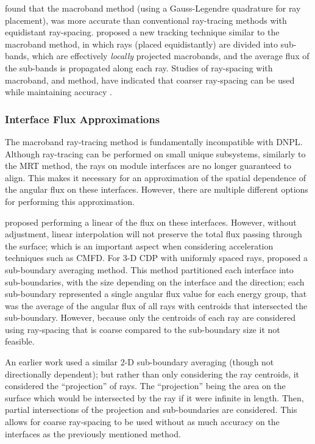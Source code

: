 {{{      \citet{Yamamoto2005} found that the macroband method (using a Gauss-Legendre quadrature for ray placement), was more accurate than conventional ray-tracing methods with equidistant ray-spacing.
      \citet{Fevotte2007} proposed a new tracking technique similar to the macroband method, in which rays (placed equidistantly) are divided into sub-bands, which are effectively \emph{locally} projected macrobands, and the average flux of the sub-bands is propagated along each ray.
      Studies of ray-spacing with macroband, and  method, have indicated that coarser ray-spacing can be used while maintaining accuracy \cite{Yamamoto2005,Fevotte2007,Yamamoto2008}.

      \subsubsection{Interface Flux Approximations}{\label{sssec:RT:Interface Flux Approximations}
        The macroband ray-tracing method is fundamentally incompatible with \acf{DNPL}.
        Although ray-tracing can be performed on small unique subsystems, similarly to the \ac{MRT} method, the rays on module interfaces are no longer guaranteed to align.
        This makes it necessary for an approximation of the spatial dependence of the angular flux on these interfaces.
        However, there are multiple different options for performing this approximation.

        \citet{Yamamoto2005} proposed performing a linear of the flux on these interfaces.
        However, without adjustment, linear interpolation will not preserve the total flux passing through the surface; which is an important aspect when considering acceleration techniques such as \ac{CMFD}.
        For 3-D \ac{CDP} with uniformly spaced rays, \citet{Liu2014} proposed a sub-boundary averaging method.
        This method partitioned each interface into sub-boundaries, with the size depending on the interface and the direction; each sub-boundary represented a single angular flux value for each energy group, that was the average of the angular flux of all rays with centroids that intersected the sub-boundary.
        However, because only the centroids of each ray are considered using ray-spacing that is coarse compared to the sub-boundary size it not feasible.

        An earlier work \cite{Hong1999} used a similar 2-D sub-boundary averaging (though not directionally dependent); but rather than only considering the ray centroids, it considered the ``projection'' of rays.
        The ``projection'' being the area on the surface which would be intersected by the ray if it were infinite in length.
        Then, partial intersections of the projection and sub-boundaries are considered.
        This allows for coarse ray-spacing to be used without as much accuracy on the interfaces as the previously mentioned method.

}}}}
